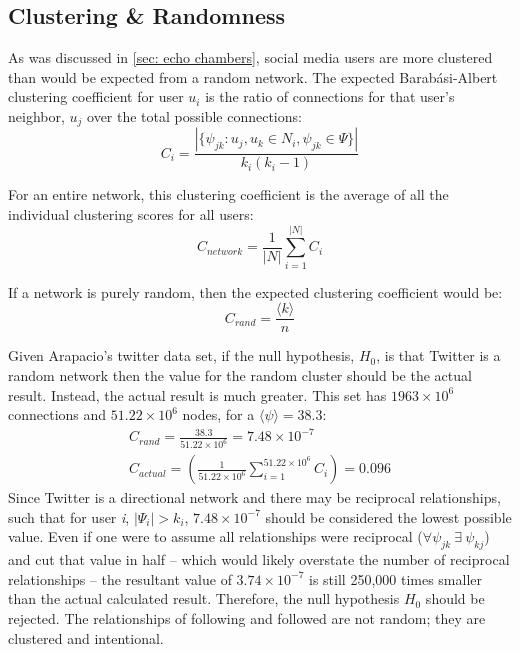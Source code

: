 \documentclass[preprint,review,12pt]{elsarticle}
\begin{document}
\subsection{Clustering \& Randomness}
\label{sec: Clustering}
As was discussed in \ref{sec: echo chambers}, social media users are more clustered than would be expected from a random network. The expected Barab{\'a}si-Albert clustering coefficient for user $u_i$ is the ratio of connections for that user's neighbor, $u_j$ over the total possible connections:
\begin{equation}
\label{clustering equation}
    C_{i}=\frac{|\{\psi_{jk}: u_j,u_k \in N_i, \psi_{jk} \in \Psi\}|}{k_i(k_i -1)}
\end{equation}

For an entire network, this clustering coefficient is the average of all the individual clustering scores for all users:
\begin{equation}
    C_{network}=\frac{1}{|N|}\sum_{i=1}^{|N|}C_i
\end{equation}

If a network is purely random, then the expected clustering coefficient would be:
\begin{equation}
    C_{rand} = \frac{\langle k \rangle}{n}
\end{equation}

Given Arapacio's twitter data set, if the null hypothesis, $H_0$, is that Twitter is a random network then the value for the random cluster should be the actual result. Instead, the actual result is much greater. This set has $1963 \times 10^6$ connections and $51.22 \times 10^6$ nodes, for a $\langle \psi \rangle = 38.3$:
\begin{equation}
    \begin{split}
    C_{rand} = \frac{38.3}{51.22 \times 10^6} = 7.48 \times 10^{-7} \\
    C_{actual} =\left( \frac{1}{51.22 \times 10^6}\sum_{i=1}^{51.22 \times 10^6}C_i \right)= 0.096
    \end{split}
\end{equation}
Since Twitter is a directional network and there may be reciprocal relationships, such that for user \textit{i}, $|\Psi_i| > k_i$, $7.48 \times 10^{-7}$ should be considered the lowest possible value. Even if one were to assume all relationships were reciprocal ($\forall \psi_{jk}\  \exists \ \psi_{kj}$) and cut that value in half -- which would likely overstate the number of reciprocal relationships -- the resultant value of $3.74 \times 10^{-7}$ is still 250,000 times smaller than the actual calculated result. Therefore, the null hypothesis $H_0$ should be rejected. The relationships of following and followed are not random; they are clustered and intentional.
\end{document}
